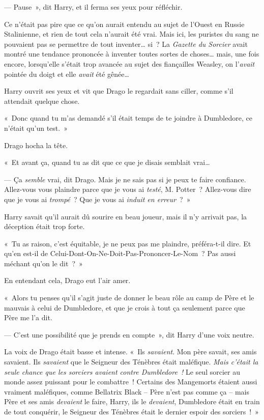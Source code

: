 --- Pause~», dit Harry, et il ferma ses yeux pour réfléchir.

Ce n'était pas pire que ce qu'on aurait entendu au sujet de l'Ouest en Russie Stalinienne, et rien de tout cela n'aurait été vrai.
Mais ici, les puristes du sang ne pouvaient pas se permettre de tout inventer… si~?
La \emph{Gazette du Sorcier} avait montré une tendance prononcée à inventer toutes sortes de choses… mais, une fois encore, lorsqu'elle s'était trop avancée au sujet des fiançailles Weasley, on l'\emph{avait} pointée du doigt et elle \emph{avait} été gênée…

Harry ouvrit ses yeux et vit que Drago le regardait sans ciller, comme s'il attendait quelque chose.

«~Donc quand tu m'as demandé s'il était temps de te joindre à Dumbledore, ce n'était qu'un test.~»

Drago hocha la tête.

«~Et avant ça, quand tu as dit que ce que je disais semblait vrai…

--- Ça \emph{semble} vrai, dit Drago.
Mais je ne sais pas si je peux te faire confiance.
Allez-vous vous plaindre parce que je vous ai \emph{testé}, M. Potter~?
Allez-vous dire que je vous ai \emph{trompé}~?
Que je vous ai \emph{induit en erreur}~?~»

Harry savait qu'il aurait dû sourire en beau joueur, mais il n'y arrivait pas, la déception était trop forte.

«~Tu as raison, c'est équitable, je ne peux pas me plaindre, préféra-t-il dire.
Et qu'en est-il de Celui-Dont-On-Ne-Doit-Pas-Prononcer-Le-Nom~?
Pas aussi méchant qu'on le dit~?~»

En entendant cela, Drago eut l'air amer.

«~Alors tu penses qu'il s'agit juste de donner le beau rôle au camp de Père et le mauvais à celui de Dumbledore, et que je crois à tout ça seulement parce que Père me l'a dit.

--- C'est une possibilité que je prends en compte~», dit Harry d'une voix neutre.

La voix de Drago était basse et intense.
«~Ils \emph{savaient}.
Mon père savait, ses amis savaient.
Ils \emph{savaient} que le Seigneur des Ténèbres était maléfique.
\emph{Mais c'était la seule chance que les sorciers avaient contre Dumbledore~!} Le seul sorcier au monde assez puissant pour le combattre~!
Certains des Mangemorts étaient aussi vraiment maléfiques, comme Bellatrix Black -- Père n'est pas comme ça -- mais Père et ses amis \emph{devaient} le faire, Harry, ils le \emph{devaient}, Dumbledore était en train de tout conquérir, le Seigneur des Ténèbres était le dernier espoir des sorciers~!~»

